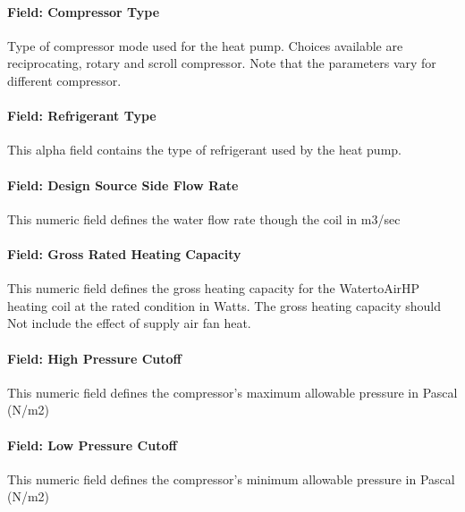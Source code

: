 \paragraph{Field: Compressor Type}\label{field-compressor-type-1}

Type of compressor mode used for the heat pump. Choices available are reciprocating, rotary and scroll compressor. Note that the parameters vary for different compressor.

\paragraph{Field: Refrigerant Type}\label{field-refrigerant-type-1}

This alpha field contains the type of refrigerant used by the heat pump.

\paragraph{Field: Design Source Side Flow Rate}\label{field-design-source-side-flow-rate-1}

This numeric field defines the water flow rate though the coil in m3/sec

\paragraph{Field: Gross Rated Heating Capacity}\label{field-gross-rated-heating-capacity-3}

This numeric field defines the gross heating capacity for the WatertoAirHP heating coil at the rated condition in Watts. The gross heating capacity should Not include the effect of supply air fan heat.

\paragraph{Field: High Pressure Cutoff}\label{field-high-pressure-cutoff-1}

This numeric field defines the compressor's maximum allowable pressure in Pascal (N/m2)

\paragraph{Field: Low Pressure Cutoff}\label{field-low-pressure-cutoff-1}

This numeric field defines the compressor's minimum allowable pressure in Pascal (N/m2)


